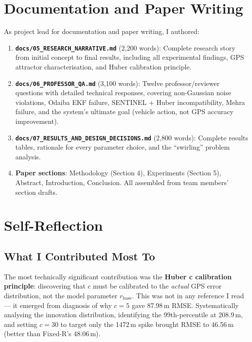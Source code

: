 \documentclass[12pt,a4paper]{article}
\begin{document}
\section{Documentation and Paper Writing}

As project lead for documentation and paper writing, I authored:

\begin{enumerate}
  \item \textbf{\texttt{docs/05\_RESEARCH\_NARRATIVE.md}} (2,200 words): Complete research
    story from initial concept to final results, including all experimental findings,
    GPS attractor characterisation, and Huber calibration principle.

  \item \textbf{\texttt{docs/06\_PROFESSOR\_QA.md}} (3,100 words): Twelve professor/reviewer
    questions with detailed technical responses, covering non-Gaussian noise violations,
    Odaiba EKF failure, SENTINEL + Huber incompatibility, Mehra failure, and the
    system's ultimate goal (vehicle action, not GPS accuracy improvement).

  \item \textbf{\texttt{docs/07\_RESULTS\_AND\_DESIGN\_DECISIONS.md}} (2,800 words):
    Complete results tables, rationale for every parameter choice, and the ``swirling''
    problem analysis.

  \item \textbf{Paper sections}: Methodology (Section 4), Experiments (Section 5),
    Abstract, Introduction, Conclusion.
    All assembled from team members' section drafts.
\end{enumerate}

\section{Self-Reflection}

\subsection{What I Contributed Most To}

The most technically significant contribution was the \textbf{Huber c calibration principle}:
discovering that $c$ must be calibrated to the \emph{actual} GPS error distribution,
not the model parameter $r_\mathrm{base}$.
This was not in any reference I read — it emerged from diagnosis of why $c=5$ gave
87.98\,m RMSE.
Systematically analysing the innovation distribution, identifying the 99th-percentile
at 208.9\,m, and setting $c=30$ to target only the 1472\,m spike brought RMSE to
46.56\,m (better than Fixed-R's 48.06\,m).
\end{document}
